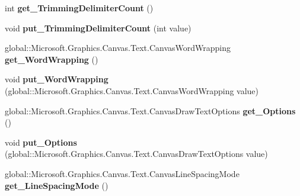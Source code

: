 \begin{DoxyCompactItemize}
int {\bfseries get\+\_\+\+Trimming\+Delimiter\+Count} ()
\item 
\mbox{\label{class_microsoft_1_1_graphics_1_1_canvas_1_1_text_1_1_canvas_text_layout_a18f401454b6445cc73346d0bdc33f5d4}} 
void {\bfseries put\+\_\+\+Trimming\+Delimiter\+Count} (int value)
\item 
\mbox{\label{class_microsoft_1_1_graphics_1_1_canvas_1_1_text_1_1_canvas_text_layout_ac9ac19d596092af238584ca5fb4d4406}} 
global\+::\+Microsoft.\+Graphics.\+Canvas.\+Text.\+Canvas\+Word\+Wrapping {\bfseries get\+\_\+\+Word\+Wrapping} ()
\item 
\mbox{\label{class_microsoft_1_1_graphics_1_1_canvas_1_1_text_1_1_canvas_text_layout_ad00875174765b3f2e3c1294ce86a36eb}} 
void {\bfseries put\+\_\+\+Word\+Wrapping} (global\+::\+Microsoft.\+Graphics.\+Canvas.\+Text.\+Canvas\+Word\+Wrapping value)
\item 
\mbox{\label{class_microsoft_1_1_graphics_1_1_canvas_1_1_text_1_1_canvas_text_layout_a1c7fdcf691594d0a65ccb802ba2da272}} 
global\+::\+Microsoft.\+Graphics.\+Canvas.\+Text.\+Canvas\+Draw\+Text\+Options {\bfseries get\+\_\+\+Options} ()
\item 
\mbox{\label{class_microsoft_1_1_graphics_1_1_canvas_1_1_text_1_1_canvas_text_layout_ad2eb965b4419db8c2fc551212750ef9e}} 
void {\bfseries put\+\_\+\+Options} (global\+::\+Microsoft.\+Graphics.\+Canvas.\+Text.\+Canvas\+Draw\+Text\+Options value)
\item 
\mbox{\label{class_microsoft_1_1_graphics_1_1_canvas_1_1_text_1_1_canvas_text_layout_a80e906d0512252d17b70c935fcc440a5}} 
global\+::\+Microsoft.\+Graphics.\+Canvas.\+Text.\+Canvas\+Line\+Spacing\+Mode {\bfseries get\+\_\+\+Line\+Spacing\+Mode} ()
\item 
\mbox{\label{class_microsoft_1_1_graphics_1_1_canvas_1_1_text_1_1_canvas_text_layout_a99b5936e69b1769d738e3d0437fa745d}} 

\end{DoxyCompactItemize}
